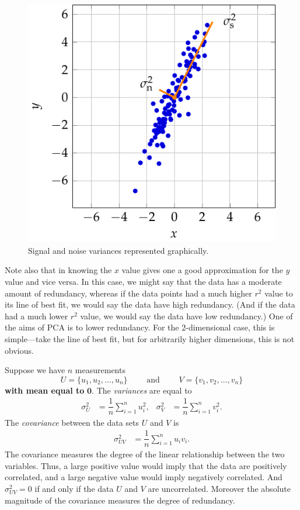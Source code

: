 \documentclass[a4paper, 12pt]{article}
\numberwithin{equation}{section}
\numberwithin{figure}{section}
\theoremstyle{definition}
\begin{document}
\begin{figure}[h]
    \centering
    \includegraphics{graphics/pca_example2.pdf}
    \caption{Signal and noise variances represented graphically.}
	\label{fig:pca-example2}
\end{figure}

Note also that in  knowing the $x$ value gives one a good
approximation for the $y$ value and vice versa. In this case, we might say that
the data has a moderate amount of redundancy, whereas if the data points had a
much higher $r^2$ value to its line of best fit, we would say the data have high
redundancy. (And if the data had a much lower $r^2$ value, we would say the data
have low redundancy.) One of the aims of PCA is to lower redundancy. For the
$2$-dimensional case, this is simple---take the line of best fit, but for
arbitrarily higher dimensions, this is not obvious. 

Suppose we have $n$ measurements 
\[ 
	U = \{u_1, u_2, \dots, u_n\} \qquad \text{ and } \qquad V = \{v_1, v_2, \dots, v_n\}
\] 
\textbf{with mean equal to} $\mathbf{0}$. The \textit{variances} are equal to 
\begin{align*} 
	\sigma_U^2 &= \dfrac{1}{n} \sum_{i=1}^n u_i^2, & \sigma_V^2 &= \dfrac{1}{n} \sum_{i=1}^n v_i^2 .
\end{align*} 
The \textit{covariance} between the data sets $U$ and $V$ is 
\begin{align*}
	\sigma_{UV}^2 &= \dfrac{1}{n} \sum_{i=1}^n u_iv_i.
\end{align*}
The covariance measures the degree of the linear relationship between the two
variables. Thus, a large positive value would imply that the data are positively
correlated, and a large negative value would imply negatively correlated. And
$\sigma_{UV}^2= 0$ if and only if the data $U$ and $V$ are uncorrelated.
Moreover the absolute magnitude of the covariance measures the degree of
redundancy. 
\end{document}
